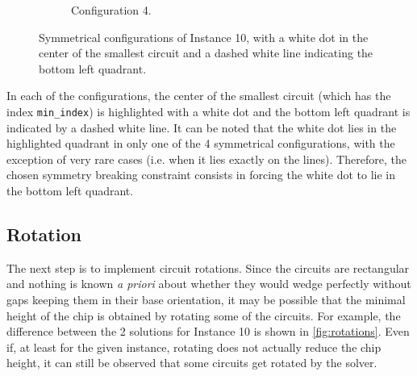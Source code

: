 \documentclass[a4paper, 12pt]{article}
\begin{document}
\begin{figure}
\begin{subfigure}[t]{0.45\textwidth}
        \caption{Configuration 4.}
    \end{subfigure}
    \caption[Symmetrical configurations.]{Symmetrical configurations of Instance 10, with a white dot in the center of the smallest circuit and a dashed white line indicating the bottom left quadrant.}
    \label{fig:solutions}
\end{figure}

In each of the configurations, the center of the smallest circuit (which has the index \verb|min_index|) is highlighted with a white dot and the bottom left quadrant is indicated by a dashed white line. It can be noted that the white dot lies in the highlighted quadrant in only one of the 4 symmetrical configurations, with the exception of very rare cases (i.e. when it lies exactly on the lines). Therefore, the chosen symmetry breaking constraint consists in forcing the white dot to lie in the bottom left quadrant.


\subsection{Rotation}

The next step is to implement circuit rotations. Since the circuits are rectangular and nothing is known \emph{a priori} about whether they would wedge perfectly without gaps keeping them in their base orientation, it may be possible that the minimal height of the chip is obtained by rotating some of the circuits. For example, the difference between the 2 solutions for Instance 10 is shown in \cref{fig:rotations}. Even if, at least for the given instance, rotating does not actually reduce the chip height, it can still be observed that some circuits get rotated by the solver.
\end{document}
